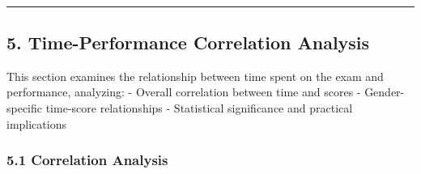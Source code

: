 \documentclass[11pt]{article}
\begin{document}
    \begin{center}
    \end{center}
    { \hspace*{\fill} \\}
    
    \begin{center}\rule{0.5\linewidth}{0.5pt}\end{center}

\subsection{5. Time-Performance Correlation
Analysis}\label{time-performance-correlation-analysis}

This section examines the relationship between time spent on the exam
and performance, analyzing: - Overall correlation between time and
scores - Gender-specific time-score relationships - Statistical
significance and practical implications

    \subsubsection{5.1 Correlation Analysis}\label{correlation-analysis}
\end{document}
